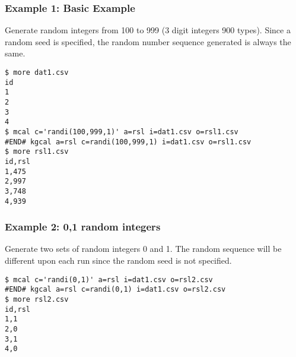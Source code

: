 \subsubsection*{Example 1: Basic Example}

Generate random integers from 100 to 999 (3 digit integers 900 types). Since a random seed is specified, the random number sequence generated is always the same.


\begin{Verbatim}[baselinestretch=0.7,frame=single]
$ more dat1.csv
id
1
2
3
4
$ mcal c='randi(100,999,1)' a=rsl i=dat1.csv o=rsl1.csv
#END# kgcal a=rsl c=randi(100,999,1) i=dat1.csv o=rsl1.csv
$ more rsl1.csv
id,rsl
1,475
2,997
3,748
4,939
\end{Verbatim}
\subsubsection*{Example 2: 0,1 random integers}

Generate two sets of random integers 0 and 1. The random sequence will be different upon each run since the random seed is not specified.


\begin{Verbatim}[baselinestretch=0.7,frame=single]
$ mcal c='randi(0,1)' a=rsl i=dat1.csv o=rsl2.csv
#END# kgcal a=rsl c=randi(0,1) i=dat1.csv o=rsl2.csv
$ more rsl2.csv
id,rsl
1,1
2,0
3,1
4,0
\end{Verbatim}
